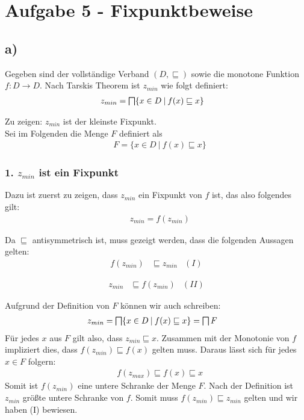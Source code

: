 \section*{Aufgabe 5 - Fixpunktbeweise}
\subsection*{a)}
Gegeben sind der vollständige Verband $(D, \sqsubseteq)$ sowie
die monotone Funktion $f: D \to D$.
Nach Tarskis Theorem ist $z_{min}$ wie folgt definiert:
\begin{align*}
&z_{min} = \Inf \{x \in D \medspace | \medspace f(x) \sqsubseteq x\}
\end{align*}

Zu zeigen: $z_{min}$ ist der kleinste Fixpunkt. \\

Sei im Folgenden die Menge $F$ definiert als \\
\begin{align*}
& F = \{x \in D \medspace |  \medspace f(x) \sqsubseteq x\}
\end{align*}

\subsubsection*{1. $z_{min}$ ist ein Fixpunkt}
Dazu ist zuerst zu zeigen, dass $z_{min}$ ein Fixpunkt von $f$ ist, das also folgendes gilt: \\
\begin{align*}
& z_{min} = f(z_{min})
\end{align*}

Da $\sqsubseteq$ antisymmetrisch ist, muss gezeigt werden, dass die folgenden Aussagen gelten:
\begin{align*}
f(z_{min})& \sqsubseteq z_{min}& (I)
\end{align*}

\begin{align*}
z_{min}& \sqsubseteq f(z_{min})& (II)
\end{align*}

Aufgrund der Definition von $F$ können wir auch schreiben:
\begin{align*}
z_{min} &= \Inf\{x \in D  \medspace |  \medspace f(x) \sqsubseteq x\} = \Inf F
\end{align*}
Für jedes $x$ aus $F$ gilt also, dass $z_{min} \sqsubseteq x$.
 Zusammen mit der Monotonie von $f$ impliziert dies, dass
$ f(z_{min}) \sqsubseteq f(x)$
gelten muss. Daraus lässt sich für jedes $x \in F$ folgern:
\begin{align*}
& f(z_{max}) \sqsubseteq f(x) \sqsubseteq x
\end{align*}
Somit ist $f(z_{min})$ eine untere Schranke der Menge $F$. Nach der Definition ist $z_{min}$ größte untere Schranke von $f$. Somit muss $f(z_{min}) \sqsubseteq z_{min}$ gelten und wir haben (I) bewiesen.\\

